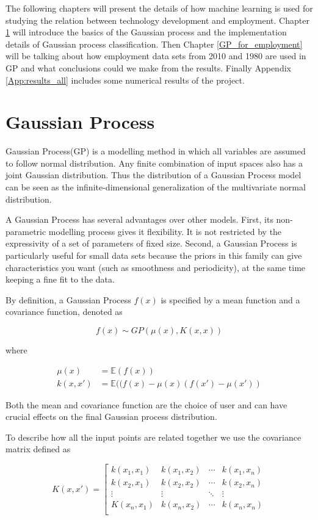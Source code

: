 \documentclass[11pt]{report}
\numberwithin{equation}{chapter}
\begin{document}
\begin{spacing}{2}
The following chapters will present the details of how machine learning is used for studying the relation between technology development and employment. Chapter  \ref{GP} will introduce the basics of the Gaussian process and the implementation details of Gaussian process classification. Then Chapter \ref{GP_for_employment} will be talking about how employment data sets from 2010 and 1980  are used in GP and what conclusions could we make from the results. Finally Appendix \ref{App:results_all} includes some numerical results of the project.




\newpage
\chapter{Gaussian Process}
\label{GP}
Gaussian Process(GP) is a modelling method in which all variables are assumed to follow normal distribution. Any finite combination of input spaces also has a joint Gaussian distribution. Thus the distribution of a Gaussian Process model can be seen as the infinite-dimensional generalization of the multivariate normal distribution. 

A Gaussian Process has several advantages over other models. First, its non-parametric modelling process gives it flexibility. It is not restricted by the expressivity of a set of parameters of fixed size. Second, a Gaussian Process is particularly useful for small data sets because the priors in this family can give characteristics you want (such as smoothness and periodicity), at the same time keeping a fine fit to the data.  

By definition, a Gaussian Process $f(x)$ is specified by a mean function and a covariance function, denoted as  

\[f(x) \sim GP(\mu(x),K(x,x))\]

where

\begin{align}
\mu(x) &= \mathbb{E}(f(x))\\
k(x,x\prime) &= \mathbb{E}((f(x) - \mu(x)(f(x\prime) - \mu(x\prime)) 
\end{align}

Both the mean and covariance function are the choice of user and can have crucial effects on the final Gaussian process distribution.

To describe how all the input points are related together we use the covariance matrix defined as 

\begin{equation}
K(x,x\prime) = \left[\begin{array}{cccc}
k(x_1,x_1) & k(x_1,x_2) & \cdots & k(x_1,x_n)\\
k(x_2,x_1) & k(x_2,x_2) & \cdots & k(x_2,x_n)\\
\vdots & \vdots & \ddots & \vdots\\
K(x_n,x_1) & k(x_n,x_2) & \cdots & k(x_n,x_n)\\


\end{array}
\end{equation}
\end{spacing}
\end{document}
